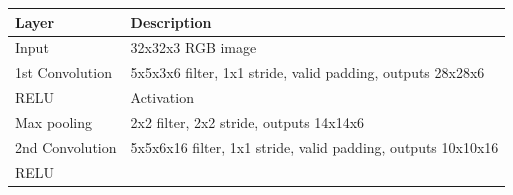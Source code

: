 \documentclass[11pt]{article}
\begin{document}
\begin{longtable}[]{@{}ll@{}}
\toprule
\begin{minipage}[b]{0.30\columnwidth}\raggedright\strut
Layer\strut
\end{minipage} & \begin{minipage}[b]{0.61\columnwidth}\raggedright\strut
Description\strut
\end{minipage}\tabularnewline
\midrule
\endhead
\begin{minipage}[t]{0.30\columnwidth}\raggedright\strut
Input\strut
\end{minipage} & \begin{minipage}[t]{0.61\columnwidth}\raggedright\strut
32x32x3 RGB image\strut
\end{minipage}\tabularnewline
\begin{minipage}[t]{0.30\columnwidth}\raggedright\strut
1st Convolution\strut
\end{minipage} & \begin{minipage}[t]{0.61\columnwidth}\raggedright\strut
5x5x3x6 filter, 1x1 stride, valid padding, outputs 28x28x6\strut
\end{minipage}\tabularnewline
\begin{minipage}[t]{0.30\columnwidth}\raggedright\strut
RELU\strut
\end{minipage} & \begin{minipage}[t]{0.61\columnwidth}\raggedright\strut
Activation\strut
\end{minipage}\tabularnewline
\begin{minipage}[t]{0.30\columnwidth}\raggedright\strut
Max pooling\strut
\end{minipage} & \begin{minipage}[t]{0.61\columnwidth}\raggedright\strut
2x2 filter, 2x2 stride, outputs 14x14x6\strut
\end{minipage}\tabularnewline
\begin{minipage}[t]{0.30\columnwidth}\raggedright\strut
2nd Convolution\strut
\end{minipage} & \begin{minipage}[t]{0.61\columnwidth}\raggedright\strut
5x5x6x16 filter, 1x1 stride, valid padding, outputs 10x10x16\strut
\end{minipage}\tabularnewline
\begin{minipage}[t]{0.30\columnwidth}\raggedright\strut
RELU\strut
\end{minipage} & \begin{minipage}[t]{0.61\columnwidth}\raggedright\strut

\end{minipage}
\end{longtable}
\end{document}

